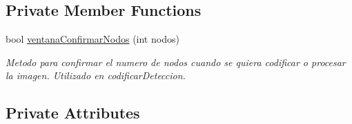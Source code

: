 \subsection*{Private Member Functions}
\begin{DoxyCompactItemize}
\item 
bool \hyperlink{classCOperacionesImagen_ae78d5392570b2cf7cf8f37378a71e1eb}{ventana\+Confirmar\+Nodos} (int nodos)
\begin{DoxyCompactList}\small\item\em Metodo para confirmar el numero de nodos cuando se quiera codificar o procesar la imagen. Utilizado en codificar\+Deteccion. \end{DoxyCompactList}\end{DoxyCompactItemize}
\subsection*{Private Attributes}
